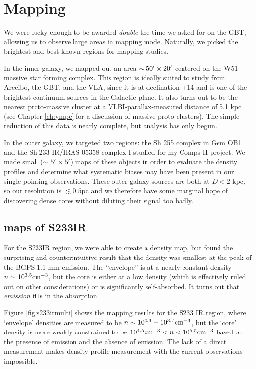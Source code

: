 
\section{\formaldehyde Mapping}
We were lucky enough to be awarded \emph{double} the time we asked for on the GBT,
allowing us to observe large areas in mapping mode.  
Naturally, we picked the brightest and best-known regions for mapping studies.

In the inner galaxy, we mapped out an area $\sim50\mbox{$^\prime$}\times20\mbox{$^\prime$}$ centered
on the W51 massive star forming complex.  This region is ideally suited to study from Arecibo,
the GBT, and the VLA, since it is at declination +14 and is one of the brightest continuum
sources in the Galactic plane.  It also turns out to be the nearest proto-massive cluster
at a VLBI-parallax-measured distance of 5.1 kpc (see Chapter \ref{ch:ympc} for a discussion
of massive proto-clusters).  The simple reduction of this data is nearly complete, but 
analysis has only begun.

In the outer galaxy, we targeted two regions: the Sh 255 complex in Gem OB1 and
the Sh 233-IR/IRAS 05358 complex I studied for my Comps II project.  We made
small ($\sim 5\mbox{$^\prime$}\times 5\mbox{$^\prime$}$) maps of these objects in order to
evaluate the density profiles and determine what systematic biases may have
been present in our single-pointing observations.  These outer galaxy sources
are both at $D<2$ kpc, so our resolution is $\lesssim 0.5 $pc and we therefore
have some marginal hope of discovering dense cores without diluting their
signal too badly.

\subsection{\formaldehyde maps of S233IR}
For the S233IR region, we were able to create a density map, but found the
surprising and counterintuitive result that the density was smallest at the
peak of the BGPS 1.1 mm emission.  The ``envelope'' is at a nearly constant density
$n\sim10^{3.5}\textrm{cm}^{-3}$, but the core is either at a low density (which is effectively
ruled out on other considerations) or is significantly self-absorbed.  It turns out 
that \formaldehyde \twotwo \emph{emission} fills in the absorption.

Figure \ref{fig:s233irmulti} shows the mapping results for the S233 IR region, where
`envelope' densities are measured to be $n\sim10^{3.3}-10^{3.7} \textrm{cm}^{-3}$, but the `core'
density is more weakly constrained to be $10^{4.5}\textrm{cm}^{-3} < n < 10^{5.5}\textrm{cm}^{-3}$ based
on the presence of \formaldehyde \twotwo emission and the absence of \oneone emission.
The lack of a direct measurement makes density profile measurement with the current
observations impossible. 

